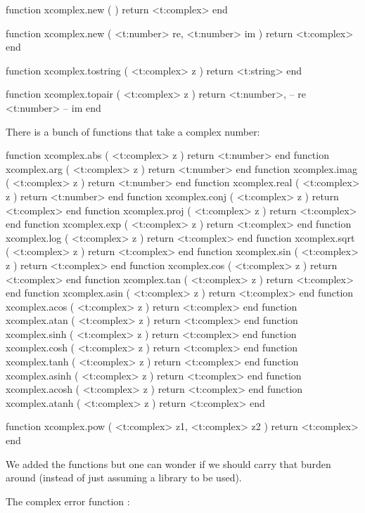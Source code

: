 \stopsubsection

\startsubsection[title=Complex numbers]

\starttyping[option=LUA]
function xcomplex.new ( )
    return <t:complex>
end

function xcomplex.new (
    <t:number> re,
    <t:number> im
)
    return <t:complex>
end
\stoptyping

\starttyping[option=LUA]
function xcomplex.tostring ( <t:complex> z )
    return <t:string>
end
\stoptyping

\starttyping[option=LUA]
function xcomplex.topair ( <t:complex> z )
    return
        <t:number>, -- re
        <t:number>  -- im
end
\stoptyping

There is a bunch of functions that take a complex number:

\starttyping[option=LUA]
function xcomplex.abs   ( <t:complex> z ) return <t:number>  end
function xcomplex.arg   ( <t:complex> z ) return <t:number>  end
function xcomplex.imag  ( <t:complex> z ) return <t:number>  end
function xcomplex.real  ( <t:complex> z ) return <t:number>  end
function xcomplex.conj  ( <t:complex> z ) return <t:complex> end
function xcomplex.proj  ( <t:complex> z ) return <t:complex> end
function xcomplex.exp   ( <t:complex> z ) return <t:complex> end
function xcomplex.log   ( <t:complex> z ) return <t:complex> end
function xcomplex.sqrt  ( <t:complex> z ) return <t:complex> end
function xcomplex.sin   ( <t:complex> z ) return <t:complex> end
function xcomplex.cos   ( <t:complex> z ) return <t:complex> end
function xcomplex.tan   ( <t:complex> z ) return <t:complex> end
function xcomplex.asin  ( <t:complex> z ) return <t:complex> end
function xcomplex.acos  ( <t:complex> z ) return <t:complex> end
function xcomplex.atan  ( <t:complex> z ) return <t:complex> end
function xcomplex.sinh  ( <t:complex> z ) return <t:complex> end
function xcomplex.cosh  ( <t:complex> z ) return <t:complex> end
function xcomplex.tanh  ( <t:complex> z ) return <t:complex> end
function xcomplex.asinh ( <t:complex> z ) return <t:complex> end
function xcomplex.acosh ( <t:complex> z ) return <t:complex> end
function xcomplex.atanh ( <t:complex> z ) return <t:complex> end

function xcomplex.pow   ( <t:complex> z1, <t:complex> z2 ) return <t:complex> end
\stoptyping

We added the  functions but one can wonder if we should carry that
burden around (instead of just assuming a library to be used).

The complex error function :

